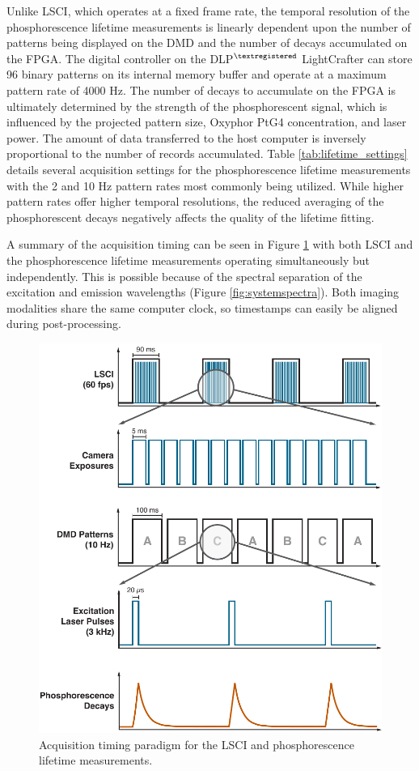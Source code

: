 Unlike LSCI, which operates at a fixed frame rate, the temporal resolution of the phosphorescence lifetime measurements is linearly dependent upon the number of patterns being displayed on the DMD and the number of decays accumulated on the FPGA. The digital controller on the DLP$^{\tiny{\textregistered}}$ LightCrafter can store 96 binary patterns on its internal memory buffer and operate at a maximum pattern rate of 4000 Hz. The number of decays to accumulate on the FPGA is ultimately determined by the strength of the phosphorescent signal, which is influenced by the projected pattern size, Oxyphor PtG4 concentration, and laser power. The amount of data transferred to the host computer is inversely proportional to the number of records accumulated. Table \ref{tab:lifetime_settings} details several acquisition settings for the phosphorescence lifetime measurements with the 2 and 10 Hz pattern rates most commonly being utilized. While higher pattern rates offer higher temporal resolutions, the reduced averaging of the phosphorescent decays negatively affects the quality of the lifetime fitting.

A summary of the acquisition timing can be seen in Figure \ref{fig:timingschematic} with both LSCI and the phosphorescence lifetime measurements operating simultaneously but independently. This is possible because of the spectral separation of the excitation and emission wavelengths (Figure \ref{fig:systemspectra}). Both imaging modalities share the same computer clock, so timestamps can easily be aligned during post-processing.

\begin{figure}
    \includegraphics{figures/chapter_2/timingschematic.pdf}
    \caption{
        \label{fig:timingschematic}
        Acquisition timing paradigm for the LSCI and phosphorescence lifetime measurements.
    }
\end{figure}

